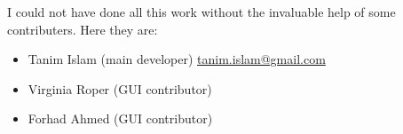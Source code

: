 \documentclass[12pt, fleqn]{article}
\begin{document}
I could not have done all this work without the invaluable help of
some contributers. Here they are:
\begin{itemize}
  \item Tanim Islam (main developer)
    \href{mailto:tanim.islam@gmail.com}{tanim.islam@gmail.com}
    
  \item Virginia Roper (GUI contributor)

  \item Forhad Ahmed (GUI contributor)  
\end{itemize}
\end{document}
